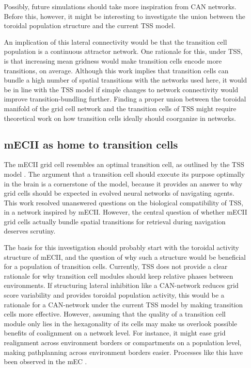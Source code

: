 \documentclass{article}
\begin{document}
    Possibly, future simulations should take more inspiration from CAN networks. Before this, however, it might be interesting to investigate the union between the toroidal population structure and the current TSS model. 
    
    An implication of this lateral connectivity would be that the transition cell population is a continuous attractor network. One rationale for this, under TSS, is that increasing mean gridness would make transition cells encode more transitions, on average. Although this work implies that transition cells can bundle a high number of spatial transitions with the networks used here, it would be in line with the TSS model if simple changes to network connectivity would improve transition-bundling further. Finding a proper union between the toroidal manifold of the grid cell network and the transition cells of TSS might require theoretical work on how transition cells ideally should coorganize in networks.
    
    \subsection{mECII as home to transition cells} \label{TSS model comparison}

    The mECII grid cell resembles an optimal transition cell, as outlined by the TSS model \parencite{Waniek2020}. The argument that a transition cell should execute its purpose optimally in the brain is a cornerstone of the model, because it provides an answer to why grid cells should be expected in evolved neural networks of navigating agents. This work resolved unanswered questions on the biological compatibility of TSS, in a network inspired by mECII. However, the central question of whether mECII grid cells actually bundle spatial transitions for retrieval during navigation deserves scrutiny.

    The basis for this investigation should probably start with the toroidal activity structure of mECII, and the question of why such a structure would be beneficial for a population of transition cells. Currently, TSS does not provide a clear rationale for why transition cell modules should keep relative phases between environments. If structuring lateral inhibition like a CAN-network reduces grid score variability and provides toroidal population activity, this would be a rationale for a CAN-network under the current TSS model by making transition cells more effective. However, assuming that the quality of a transition cell module only lies in the hexagonality of its cells may make us overlook possible benefits of coalignment on a network level. For instance, it might ease grid realignment across environment borders or compartments on a population level, making pathplanning across environment borders easier. Processes like this have been observed in the mEC \parencite{Carpenter2015}.
\end{document}
